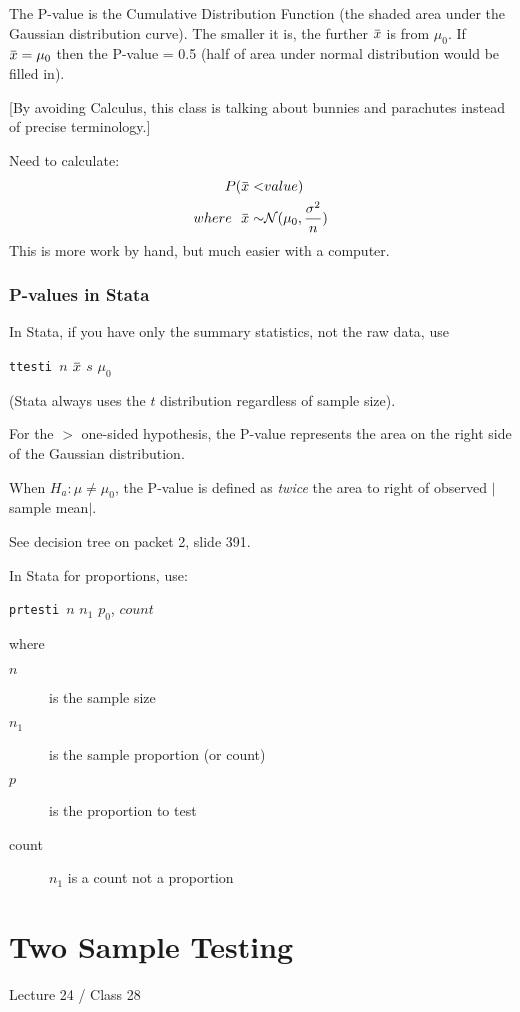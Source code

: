 \documentclass[11pt, oneside]{article}   	%
\newcommand{\overbar}[1]{\mkern 1.5mu\overline{\mkern-1.5mu#1\mkern-1.5mu}\mkern 1.5mu}
\begin{document}
The P-value is the Cumulative Distribution Function (the shaded area under the Gaussian distribution curve). The smaller it is, the further $\overbar{x}$ is from $\mu_0$. If $\overbar{x} = \mu_0$ then the P-value = 0.5 (half of area under normal distribution would be filled in).

[By avoiding Calculus, this class is talking about bunnies and parachutes instead of precise terminology.]

Need to calculate:
\begin{align*}
P(\overbar{x} <& value) \\
where \  \ \overbar{x} \sim& \mathcal{N}(\mu_0, \frac{\sigma^2}{n})
\end{align*}
This is more work by hand, but much easier with a computer.

\subsubsection{P-values in Stata}

In Stata, if you have only the summary statistics, not the raw data, use

 \texttt{ttesti }$n$ $\overbar{x}$ $s$ $\mu_0$
 
 (Stata always uses the $t$ distribution regardless of sample size).
 
 For the $>$ one-sided hypothesis, the P-value represents the area on the right side of the Gaussian distribution.
 
 When $H_a : \mu \neq \mu_0$, the P-value is defined as \textit{twice} the area to right of observed $|$sample mean$|$.
 
 See decision tree on packet 2, slide 391.
 
In Stata for proportions, use:

 \texttt{prtesti }$n$ $n_1$ $p_0$, $count$
 
 where
 \begin{description}
 \item [$n$]is the sample size
 \item[$n_1$] is the sample proportion (or count)
 \item[$p$] is the proportion to test
 \item[count]$n_1$ is a count not a proportion
 \end{description}

\section{Two Sample Testing}
Lecture 24 / Class 28
\end{document}

